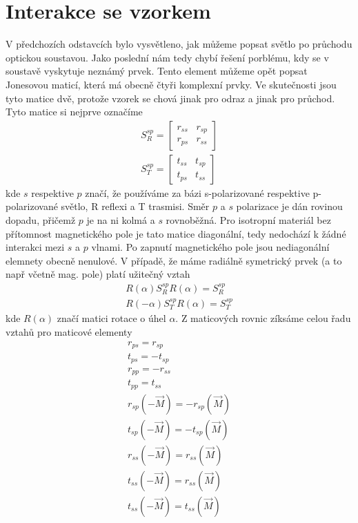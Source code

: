 \section{Interakce se vzorkem}
V předchozích odstavcích bylo vysvětleno, jak můžeme popsat světlo po průchodu optickou soustavou. Jako poslední nám tedy chybí řešení porblému, kdy se v soustavě vyskytuje neznámý prvek. Tento element můžeme opět popsat Jonesovou maticí, která má obecně čtyři komplexní prvky. Ve skutečnosti jsou tyto matice dvě, protože vzorek se chová jinak pro odraz a jinak pro průchod. Tyto matice si nejprve označíme
\begin{eqnarray}
S^{sp}_R = \begin{bmatrix} r_{ss} & r_{sp} \\ r_{ps} & r_{ss} \end{bmatrix} \\
S^{sp}_T = \begin{bmatrix} t_{ss} & t_{sp} \\ t_{ps} & t_{ss} \end{bmatrix} 
\end{eqnarray}
kde $s$ respektive $p$ značí, že používáme za bázi s-polarizované respektive p-polarizované světlo, R  reflexi a T trasmisi. Směr $p$ a $s$ polarizace je dán rovinou dopadu, přičemž $p$ je na ni kolmá a $s$ rovnoběžná. Pro isotropní materiál bez přítomnost magnetického pole je tato matice diagonální, tedy nedochází k žádné interakci mezi $s$ a $p$ vlnami. Po zapnutí magnetického pole jsou nediagonální elemnety obecně nenulové. V případě, že máme radiálně symetrický prvek (a to např včetně mag. pole) platí užitečný vztah
\begin{eqnarray}
R(\alpha)S^{sp}_RR(\alpha)=S^{sp}_R \\
R(-\alpha)S^{sp}_TR(\alpha)=S^{sp}_T
\end{eqnarray}
kde $R(\alpha)$ značí matici rotace o úhel $\alpha$.
Z maticových rovnic zíksáme celou řadu vztahů pro maticové elementy
\begin{eqnarray}
r_{ps}=r_{sp} \\
t_{ps}=-t_{sp} \\
r_{pp}=-r_{ss} \\
t_{pp}=t_{ss} \\
r_{sp}(-\vec{M})=-r_{sp}(\vec{M}) \\
t_{sp}(-\vec{M})=-t_{sp}(\vec{M}) \\
r_{ss}(-\vec{M})=r_{ss}(\vec{M}) \\
t_{ss}(-\vec{M})=r_{ss}(\vec{M}) \\
t_{ss}(-\vec{M})=t_{ss}(\vec{M})
\end{eqnarray}
